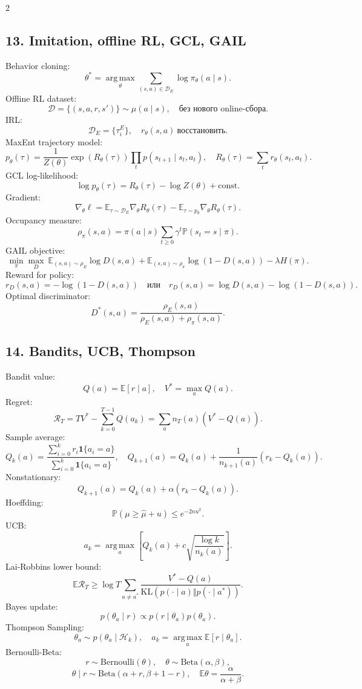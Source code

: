 \documentclass[8pt,a4paper]{extarticle}
\newcommand{\E}{\mathbb E}
\renewcommand{\Prob}{\mathbb P}
\newcommand{\KL}{\mathrm{KL}}
\newcommand{\argmax}{\operatorname*{arg\,max}}
\newcommand{\cD}{\mathcal D}
\newcommand{\1}{\mathbf 1}
\begin{document}
\begin{multicols*}{2}
\subsection*{13. Imitation, offline RL, GCL, GAIL}
Behavior cloning:
\[
\theta^*=\argmax_\theta\sum_{(s,a)\in\cD_E}\log\pi_\theta(a\mid s).
\]
Offline RL dataset:
\[
\cD=\{(s,a,r,s')\}\sim\mu(a\mid s),\quad \text{без нового online-сбора.}
\]
IRL:
\[
\cD_E=\{\tau_i^E\},\quad r_\theta(s,a)\ \text{восстановить}.
\]
MaxEnt trajectory model:
\[
p_\theta(\tau)=\frac1{Z(\theta)}\exp(R_\theta(\tau))\prod_t p(s_{t+1}\mid s_t,a_t),
\quad R_\theta(\tau)=\sum_t r_\theta(s_t,a_t).
\]
GCL log-likelihood:
\[
\log p_\theta(\tau)=R_\theta(\tau)-\log Z(\theta)+\text{const}.
\]
Gradient:
\[
\nabla_\theta \ell=\E_{\tau\sim\cD_E}\nabla_\theta R_\theta(\tau)-\E_{\tau\sim p_\theta}\nabla_\theta R_\theta(\tau).
\]
Occupancy measure:
\[
\rho_\pi(s,a)=\pi(a\mid s)\sum_{t\ge0}\gamma^t\Prob(s_t=s\mid\pi).
\]
GAIL objective:
\[
\min_\pi\max_D\ \E_{(s,a)\sim\rho_E}\log D(s,a)
+\E_{(s,a)\sim\rho_\pi}\log(1-D(s,a))-\lambda H(\pi).
\]
Reward for policy:
\[
r_D(s,a)=-\log(1-D(s,a))
\quad\text{или}\quad
r_D(s,a)=\log D(s,a)-\log(1-D(s,a)).
\]
Optimal discriminator:
\[
D^*(s,a)=\frac{\rho_E(s,a)}{\rho_E(s,a)+\rho_\pi(s,a)}.
\]

\subsection*{14. Bandits, UCB, Thompson}
Bandit value:
\[
Q(a)=\E[r\mid a],\quad V^*=\max_a Q(a).
\]
Regret:
\[
\mathcal R_T=TV^*-\sum_{k=0}^{T-1}Q(a_k)=\sum_a n_T(a)(V^*-Q(a)).
\]
Sample average:
\[
Q_k(a)=\frac{\sum_{i=0}^{k}r_i\1\{a_i=a\}}{\sum_{i=0}^{k}\1\{a_i=a\}},
\quad Q_{k+1}(a)=Q_k(a)+\frac1{n_{k+1}(a)}(r_k-Q_k(a)).
\]
Nonstationary:
\[
Q_{k+1}(a)=Q_k(a)+\alpha(r_k-Q_k(a)).
\]
Hoeffding:
\[
\Prob(\mu\ge\hat\mu+u)\le e^{-2nu^2}.
\]
UCB:
\[
a_k=\argmax_a\left[Q_k(a)+c\sqrt{\frac{\log k}{n_k(a)}}\right].
\]
Lai-Robbins lower bound:
\[
\E\mathcal R_T\ge \log T\sum_{a\ne a^*}\frac{V^*-Q(a)}{\KL(p(\cdot\mid a)\Vert p(\cdot\mid a^*))}.
\]
Bayes update:
\[
p(\theta_a\mid r)\propto p(r\mid\theta_a)p(\theta_a).
\]
Thompson Sampling:
\[
\theta_a\sim p(\theta_a\mid\mathcal H_k),
\quad a_k=\argmax_a \E[r\mid\theta_a].
\]
Bernoulli-Beta:
\[
r\sim\mathrm{Bernoulli}(\theta),
\quad \theta\sim\mathrm{Beta}(\alpha,\beta),
\]
\[
\theta\mid r\sim\mathrm{Beta}(\alpha+r,\beta+1-r),
\quad \E\theta=\frac{\alpha}{\alpha+\beta}.
\]


\end{multicols*}
\end{document}

